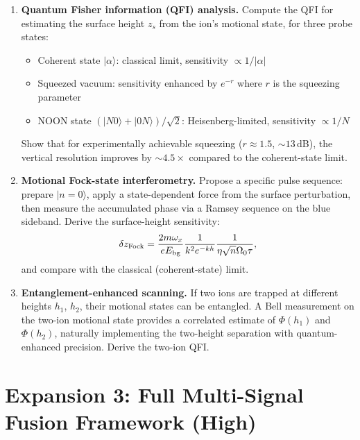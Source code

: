 \documentclass[11pt,a4paper]{article}
\begin{document}
\begin{enumerate}[label=\textbf{Q\arabic*}, leftmargin=*]

    \item \textbf{Quantum Fisher information (QFI) analysis.}
    Compute the QFI for estimating the surface height $z_s$ from the ion's motional state, for three probe states:
    \begin{itemize}
        \item Coherent state $|\alpha\rangle$: classical limit, sensitivity $\propto 1/|\alpha|$
        \item Squeezed vacuum: sensitivity enhanced by $e^{-r}$ where $r$ is the squeezing parameter
        \item NOON state $(|N0\rangle + |0N\rangle)/\sqrt{2}$: Heisenberg-limited, sensitivity $\propto 1/N$
    \end{itemize}
    Show that for experimentally achievable squeezing ($r \approx 1.5$, $\sim 13$\,dB), the vertical resolution improves by ${\sim}4.5\times$ compared to the coherent-state limit.

    \item \textbf{Motional Fock-state interferometry.}
    Propose a specific pulse sequence: prepare $|n=0\rangle$, apply a state-dependent force from the surface perturbation, then measure the accumulated phase via a Ramsey sequence on the blue sideband. Derive the surface-height sensitivity:
    \begin{equation}
    \delta z_{\rm Fock} = \frac{2m\omega_x}{eE_{\rm bg}} \frac{1}{k^2 e^{-kh}} \frac{1}{\eta\sqrt{n}\Omega_0\tau},
    \end{equation}
    and compare with the classical (coherent-state) limit.

    \item \textbf{Entanglement-enhanced scanning.}
    If two ions are trapped at different heights $h_1$, $h_2$, their motional states can be entangled. A Bell measurement on the two-ion motional state provides a correlated estimate of $\Phi(h_1)$ and $\Phi(h_2)$, naturally implementing the two-height separation with quantum-enhanced precision. Derive the two-ion QFI.

\end{enumerate}

\section{Expansion 3: Full Multi-Signal Fusion Framework (High)}
\end{document}
